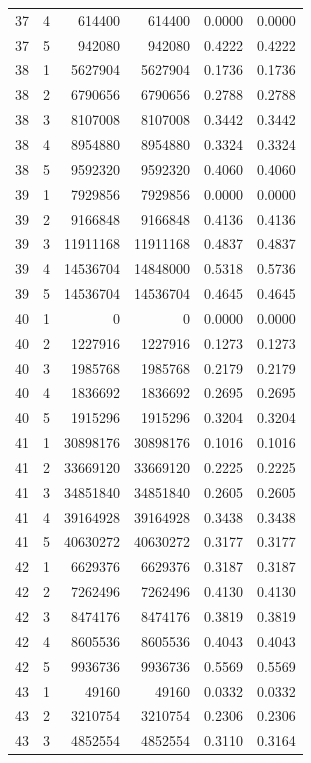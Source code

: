 \begin{longtable}{rrrrrr}
37 & 4 & 614400 & 614400 & 0.0000 & 0.0000 \\
37 & 5 & 942080 & 942080 & 0.4222 & 0.4222 \\
38 & 1 & 5627904 & 5627904 & 0.1736 & 0.1736 \\
38 & 2 & 6790656 & 6790656 & 0.2788 & 0.2788 \\
38 & 3 & 8107008 & 8107008 & 0.3442 & 0.3442 \\
38 & 4 & 8954880 & 8954880 & 0.3324 & 0.3324 \\
38 & 5 & 9592320 & 9592320 & 0.4060 & 0.4060 \\
39 & 1 & 7929856 & 7929856 & 0.0000 & 0.0000 \\
39 & 2 & 9166848 & 9166848 & 0.4136 & 0.4136 \\
39 & 3 & 11911168 & 11911168 & 0.4837 & 0.4837 \\
39 & 4 & 14536704 & 14848000 & 0.5318 & 0.5736 \\
39 & 5 & 14536704 & 14536704 & 0.4645 & 0.4645 \\
40 & 1 & 0 & 0 & 0.0000 & 0.0000 \\
40 & 2 & 1227916 & 1227916 & 0.1273 & 0.1273 \\
40 & 3 & 1985768 & 1985768 & 0.2179 & 0.2179 \\
40 & 4 & 1836692 & 1836692 & 0.2695 & 0.2695 \\
40 & 5 & 1915296 & 1915296 & 0.3204 & 0.3204 \\
41 & 1 & 30898176 & 30898176 & 0.1016 & 0.1016 \\
41 & 2 & 33669120 & 33669120 & 0.2225 & 0.2225 \\
41 & 3 & 34851840 & 34851840 & 0.2605 & 0.2605 \\
41 & 4 & 39164928 & 39164928 & 0.3438 & 0.3438 \\
41 & 5 & 40630272 & 40630272 & 0.3177 & 0.3177 \\
42 & 1 & 6629376 & 6629376 & 0.3187 & 0.3187 \\
42 & 2 & 7262496 & 7262496 & 0.4130 & 0.4130 \\
42 & 3 & 8474176 & 8474176 & 0.3819 & 0.3819 \\
42 & 4 & 8605536 & 8605536 & 0.4043 & 0.4043 \\
42 & 5 & 9936736 & 9936736 & 0.5569 & 0.5569 \\
43 & 1 & 49160 & 49160 & 0.0332 & 0.0332 \\
43 & 2 & 3210754 & 3210754 & 0.2306 & 0.2306 \\
43 & 3 & 4852554 & 4852554 & 0.3110 & 0.3164 \\

\end{longtable}

